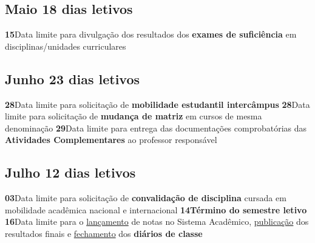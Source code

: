 \documentclass[thesis]{hmcposter}
\begin{document}
\begin{poster}
\subsection{Maio \hfill 18 dias letivos}\textbf{15}\qquad Data limite para divulgação dos resultados dos \textbf{exames de suficiência} em disciplinas/unidades curriculares \newline \null\subsection{Junho \hfill 23 dias letivos}\textbf{28}\qquad Data limite para solicitação de \textbf{mobilidade estudantil intercâmpus} \newline \null\textbf{28}\qquad Data limite para solicitação de \textbf{mudança de matriz} em cursos de mesma denominação \newline \null\textbf{29}\qquad Data limite para entrega das documentações comprobatórias das \textbf{Atividades Complementares} ao professor responsável \newline \null\subsection{Julho \hfill 12 dias letivos}\textbf{03}\qquad Data limite para solicitação de \textbf{convalidação de disciplina} cursada em mobilidade acadêmica nacional e internacional \newline \null\textbf{14}\qquad \textbf{Término do semestre letivo} \newline \null\textbf{16}\qquad Data limite para o \underline{lançamento} de notas no Sistema Acadêmico, \underline{publicação} dos resultados finais e \underline{fechamento} dos \textbf{diários de classe} \newline \null\newpage

\end{poster}
\end{document}
